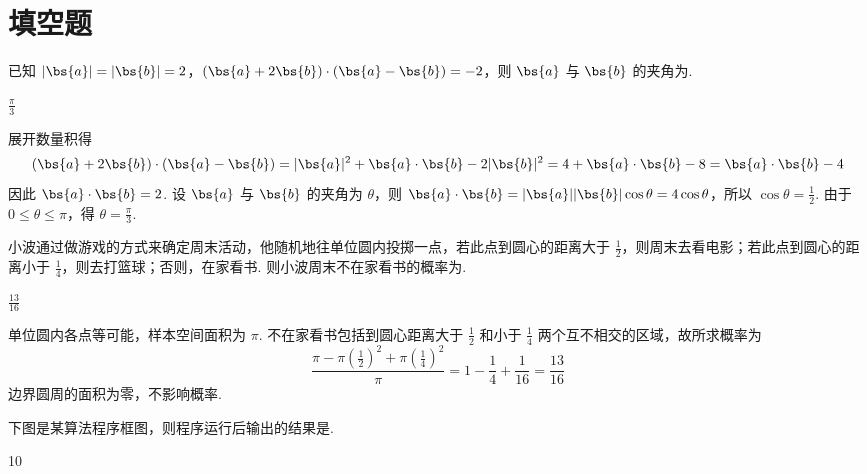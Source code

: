 \section{填空题}

\begin{problem}
已知 \(|\bs{a}| = |\bs{b}| = 2\)，\((\bs{a} + 2\bs{b}) \cdot (\bs{a} - \bs{b}) = -2\)，则 \(\bs{a}\) 与 \(\bs{b}\) 的夹角为\fillinblank{}.
\end{problem}

\begin{answer}
\(\frac{\pi}{3}\)
\end{answer}

\begin{solution}
展开数量积得
\[
(\bs{a}+2\bs{b})\cdot(\bs{a}-\bs{b})=|\bs{a}|^2+\bs{a}\cdot\bs{b}-2|\bs{b}|^2=4+\bs{a}\cdot\bs{b}-8=\bs{a}\cdot\bs{b}-4
\]
因此 \(\bs{a}\cdot\bs{b}=2\). 设 \(\bs{a}\) 与 \(\bs{b}\) 的夹角为 \(\theta\)，则
\(\bs{a}\cdot\bs{b}=|\bs{a}||\bs{b}|\cos\theta=4\cos\theta\)，所以
\(\cos\theta=\frac{1}{2}\). 由于 \(0\leqslant\theta\leqslant\pi\)，得
\(\theta=\frac{\pi}{3}\).
\end{solution}

\begin{problem}
小波通过做游戏的方式来确定周末活动，他随机地往单位圆内投掷一点，若此点到圆心的距离大于 \(\frac{1}{2}\)，则周末去看电影；若此点到圆心的距离小于 \(\frac{1}{4}\)，则去打篮球；否则，在家看书. 则小波周末不在家看书的概率为\fillinblank{}.
\end{problem}

\begin{answer}
\(\frac{13}{16}\)
\end{answer}

\begin{solution}
单位圆内各点等可能，样本空间面积为 \(\pi\). 不在家看书包括到圆心距离大于
\(\frac{1}{2}\) 和小于 \(\frac{1}{4}\) 两个互不相交的区域，故所求概率为
\[
\frac{\pi-\pi\left(\frac{1}{2}\right)^2+\pi\left(\frac{1}{4}\right)^2}{\pi}
=1-\frac{1}{4}+\frac{1}{16}=\frac{13}{16}
\]
边界圆周的面积为零，不影响概率.
\end{solution}

\begin{problem}
下图是某算法程序框图，则程序运行后输出的结果是\fillinblank{}.

\end{problem}

\begin{answer}
10
\end{answer}

